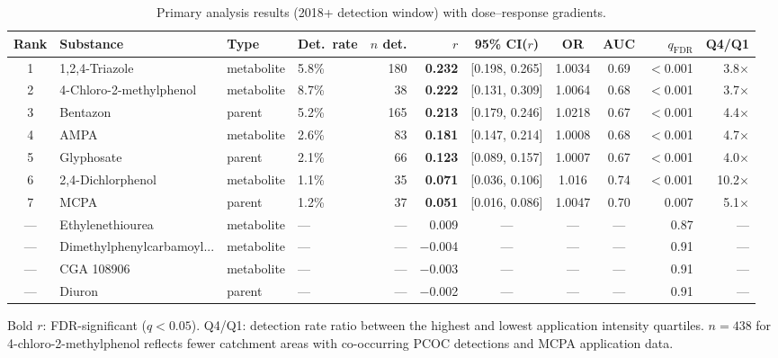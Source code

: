 \documentclass[12pt,a4paper]{article}
\begin{document}
\begin{landscape}
\begin{table}
\centering
\caption{Primary analysis results (2018+ detection window) with dose--response gradients.}
\label{tab:primary}
\footnotesize
\begin{tabular}{@{}clllrrcccrr@{}}
\toprule
Rank & Substance & Type & Det.\ rate & $n$ det. & $r$ & 95\% CI($r$) & OR & AUC & $q_{\text{FDR}}$ & Q4/Q1 \\
\midrule
1 & 1,2,4-Triazole & metabolite & 5.8\% & 180 & \textbf{0.232} & [0.198, 0.265] & 1.0034 & 0.69 & $<$0.001 & 3.8$\times$ \\
2 & 4-Chloro-2-methylphenol & metabolite & 8.7\% & 38 & \textbf{0.222} & [0.131, 0.309] & 1.0064 & 0.68 & $<$0.001 & 3.7$\times$ \\
3 & Bentazon & parent & 5.2\% & 165 & \textbf{0.213} & [0.179, 0.246] & 1.0218 & 0.67 & $<$0.001 & 4.4$\times$ \\
4 & AMPA & metabolite & 2.6\% & 83 & \textbf{0.181} & [0.147, 0.214] & 1.0008 & 0.68 & $<$0.001 & 4.7$\times$ \\
5 & Glyphosate & parent & 2.1\% & 66 & \textbf{0.123} & [0.089, 0.157] & 1.0007 & 0.67 & $<$0.001 & 4.0$\times$ \\
6 & 2,4-Dichlorphenol & metabolite & 1.1\% & 35 & \textbf{0.071} & [0.036, 0.106] & 1.016 & 0.74 & $<$0.001 & 10.2$\times$ \\
7 & MCPA & parent & 1.2\% & 37 & \textbf{0.051} & [0.016, 0.086] & 1.0047 & 0.70 & 0.007 & 5.1$\times$ \\
\midrule
--- & Ethylenethiourea & metabolite & --- & --- & 0.009 & --- & --- & --- & 0.87 & --- \\
--- & Dimethylphenylcarbamoyl... & metabolite & --- & --- & $-$0.004 & --- & --- & --- & 0.91 & --- \\
--- & CGA 108906 & metabolite & --- & --- & $-$0.003 & --- & --- & --- & 0.91 & --- \\
--- & Diuron & parent & --- & --- & $-$0.002 & --- & --- & --- & 0.91 & --- \\
\bottomrule
\end{tabular}
\normalsize

\medskip
\noindent\footnotesize Bold $r$: FDR-significant ($q < 0.05$). Q4/Q1: detection rate ratio between the highest and lowest application intensity quartiles. $n = 438$ for 4-chloro-2-methylphenol reflects fewer catchment areas with co-occurring PCOC detections and MCPA application data.
\end{table}
\end{landscape}
\end{document}
